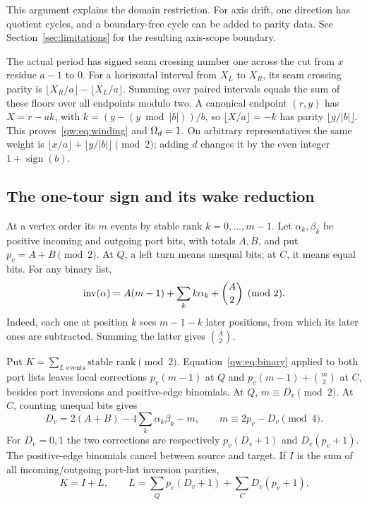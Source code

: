 This argument explains the domain restriction. For axis drift, one direction
has quotient cycles, and a boundary-free cycle can be added to parity data.
See Section~\ref{sec:limitations} for the resulting axis-scope boundary.

The actual period has signed seam crossing number one across the cut from
$x$ residue $a-1$ to $0$. For a horizontal interval from $X_L$ to $X_R$, its
seam crossing parity is $\lfloor X_R/a\rfloor-\lfloor X_L/a\rfloor$.
Summing over paired intervals equals the sum of these floors over all endpoints
modulo two. A canonical endpoint $(r,y)$ has $X=r-ak$, with
$k=(y-(y\bmod|b|))/b$, so $\lfloor X/a\rfloor=-k$ has parity
$\lfloor y/|b|\rfloor$. This proves~\eqref{qw:eq:winding} and $\Omega_d=1$.
On arbitrary representatives the same weight is
$\lfloor x/a\rfloor+\lfloor y/|b|\rfloor\pmod2$; adding $d$ changes it by the
even integer $1+\operatorname{sign}(b)$.

\subsection{The one-tour sign and its wake reduction}
At a vertex order its $m$ events by stable rank $k=0,\ldots,m-1$.
Let $\alpha_k,\beta_k$ be positive incoming and outgoing port bits, with totals
$A,B$, and put $p_v=A+B\pmod2$. At $Q$, a left turn means unequal bits;
at $C$, it means equal bits. For any binary list,
\begin{equation}
 \operatorname{inv}(\alpha)=A(m-1)+\sum_k k\alpha_k+\binom A2\pmod2.
 \label{qw:eq:binary}
\end{equation}
Indeed, each one at position $k$ sees $m-1-k$ later positions, from which its
later ones are subtracted. Summing the latter gives $\binom A2$.

Put $K=\sum_{L\text{ events}}\text{stable rank}\pmod2$.
Equation~\eqref{qw:eq:binary} applied to both port lists leaves local corrections
$p_v(m-1)$ at $Q$ and $p_v(m-1)+\binom m2$ at $C$, besides port inversions and
positive-edge binomials. At $Q$, $m\equiv D_v\pmod2$. At $C$, counting unequal
bits gives
\[
 D_v=2(A+B)-4\sum_k\alpha_k\beta_k-m,
 \qquad m\equiv2p_v-D_v\pmod4.
\]
For $D_v=0,1$ the two corrections are respectively $p_v(D_v+1)$ and
$D_v(p_v+1)$. The positive-edge binomials cancel between source and target.
If $I$ is the sum of all incoming/outgoing port-list inversion parities,
\begin{equation}
 K=I+L,\qquad L=\sum_Qp_v(D_v+1)+\sum_CD_v(p_v+1).\label{qw:eq:local}
\end{equation}

